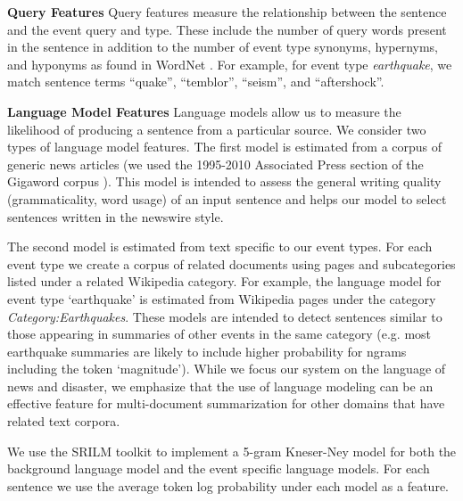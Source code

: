\textbf{Query Features}
Query features measure the relationship between the sentence and the event query and type.  These include the number of query words present in the sentence in addition to the number of event type synonyms, hypernyms, and hyponyms as found in WordNet \cite{miller1995wordnet}.  
For example, for event type \emph{earthquake},  we match sentence terms 
``quake'', ``temblor'', ``seism'', and ``aftershock''.

\textbf{Language Model Features}\label{subsubsec:lm}
Language models allow us to measure the likelihood of producing a sentence 
from a particular source.  We consider two types of language model 
features.  The first model is estimated from a corpus of generic news 
articles (we used the 1995-2010 Associated Press section of the 
Gigaword corpus \cite{graff2003english}).  
This model is intended to assess the general writing quality (grammaticality, word usage) of an input sentence and helps our model to select sentences
written in the newswire style.  

The second model is estimated from text specific to our event types.  
For each event type we create a corpus of related documents using pages
and subcategories listed under a related Wikipedia category.
For example, the language model for event type `earthquake' is estimated 
from Wikipedia pages under the category \emph{Category:Earthquakes}.  
These models are intended to detect sentences similar to those appearing in 
summaries of other events in the same category 
(e.g. most earthquake summaries are likely to include higher probability for 
ngrams including the token `magnitude'). While we focus our system on the 
language of news and disaster, we emphasize that the use of language modeling 
can be an effective feature for multi-document summarization for other 
domains that have related text corpora.




We use the SRILM toolkit \cite{stolcke2002srilm} to implement a 5-gram Kneser-Ney model for both
the background language model and the event specific language models.
For each sentence we use the average token log probability under each model
as a feature.




